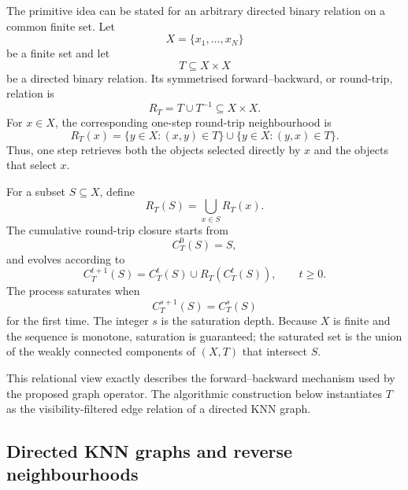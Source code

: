 \documentclass[pdflatex,sn-basic,Numbered]{sn-jnl}
\begin{document}
The primitive idea can be stated for an arbitrary directed binary relation on
a common finite set.  Let
\begin{equation}
X=\{x_1,\ldots,x_N\}
\end{equation}
be a finite set and let
\begin{equation}
T\subseteq X\times X
\end{equation}
be a directed binary relation.  Its symmetrised forward--backward, or
round-trip, relation is
\begin{equation}
R_T=T\cup T^{-1}\subseteq X\times X.
\end{equation}
For $x\in X$, the corresponding one-step round-trip neighbourhood is
\begin{equation}
R_T(x)=\{y\in X:(x,y)\in T\}\cup\{y\in X:(y,x)\in T\}.
\label{eq:relational_roundtrip}
\end{equation}
Thus, one step retrieves both the objects selected directly by $x$ and the
objects that select $x$.

For a subset $S\subseteq X$, define
\begin{equation}
R_T(S)=\bigcup_{x\in S}R_T(x).
\end{equation}
The cumulative round-trip closure starts from
\begin{equation}
C_T^0(S)=S,
\end{equation}
and evolves according to
\begin{equation}
C_T^{t+1}(S)=C_T^t(S)\cup R_T(C_T^t(S)),\qquad t\geq 0.
\label{eq:relational_iteration}
\end{equation}
The process saturates when
\begin{equation}
C_T^{s+1}(S)=C_T^s(S)
\end{equation}
for the first time.  The integer $s$ is the saturation depth.  Because $X$ is
finite and the sequence is monotone, saturation is guaranteed; the saturated
set is the union of the weakly connected components of $(X,T)$ that intersect
$S$.

This relational view exactly describes the forward--backward mechanism used by
the proposed graph operator.  The algorithmic construction below instantiates
$T$ as the visibility-filtered edge relation of a directed KNN graph.

\subsection{Directed KNN graphs and reverse neighbourhoods}\label{sec:knn_graph}
\end{document}
